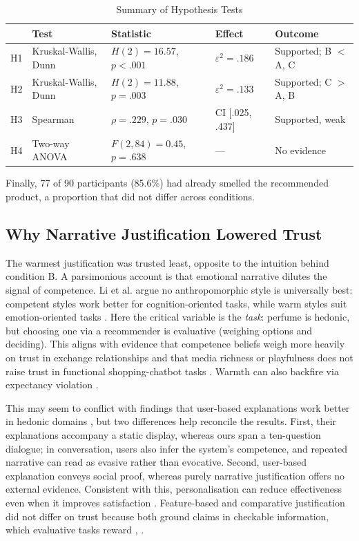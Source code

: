 \documentclass[conference]{IEEEtran}
\begin{document}
\begin{table}[htbp]
\caption{Summary of Hypothesis Tests}
\begin{center}
\renewcommand{\arraystretch}{1.1}
\setlength{\tabcolsep}{3.4pt}
\begin{tabular}{@{}p{0.5cm}p{2.35cm}p{1.75cm}p{0.95cm}p{1.35cm}@{}}
\toprule
& \textbf{Test} & \textbf{Statistic} & \textbf{Effect} & \textbf{Outcome} \\
\midrule
H1 & Kruskal-Wallis, Dunn & $H(2)=16.57$, $p<.001$ & $\varepsilon^{2}=.186$ & Supported; B $<$ A, C \\
H2 & Kruskal-Wallis, Dunn & $H(2)=11.88$, $p=.003$ & $\varepsilon^{2}=.133$ & Supported; C $>$ A, B \\
H3 & Spearman & $\rho=.229$, $p=.030$ & CI [.025, .437] & Supported, weak \\
H4 & Two-way ANOVA & $F(2,84)=0.45$, $p=.638$ & --- & No evidence \\
\bottomrule
\end{tabular}
\label{tab:hyp}
\end{center}
\end{table}

Finally, 77 of 90 participants (85.6\%) had already smelled the recommended product, a
proportion that did not differ across conditions.

\subsection{Why Narrative Justification Lowered Trust}

The warmest justification was trusted least, opposite to the intuition behind condition B.
A parsimonious account is that emotional narrative dilutes the signal of competence.
Li et al. argue no anthropomorphic style is universally best: competent styles work better
for cognition-oriented tasks, while warm styles suit emotion-oriented tasks \cite{libaoku2024}.
Here the critical variable is the \textit{task}: perfume is hedonic, but choosing one via a
recommender is evaluative (weighing options and deciding). This aligns with evidence that
competence beliefs weigh more heavily on trust in exchange relationships \cite{cheng2022}
and that media richness or playfulness does not raise trust in functional shopping-chatbot
tasks \cite{yen2021}. Warmth can also backfire via expectancy violation \cite{crolic2022}.

This may seem to conflict with findings that user-based explanations work better in
hedonic domains \cite{chen2024}, but two differences help reconcile the results. First,
their explanations accompany a static display, whereas ours span a ten-question dialogue;
in conversation, users also infer the system's competence, and repeated narrative can read
as evasive rather than evocative. Second, user-based explanation conveys social proof,
whereas purely narrative justification offers no external evidence. Consistent with this,
personalisation can reduce effectiveness even when it improves satisfaction \cite{tintarev2012}.
Feature-based and comparative justification did not differ on trust because both ground
claims in checkable information, which evaluative tasks reward \cite{brito2023}, \cite{wang2007}.
\end{document}
